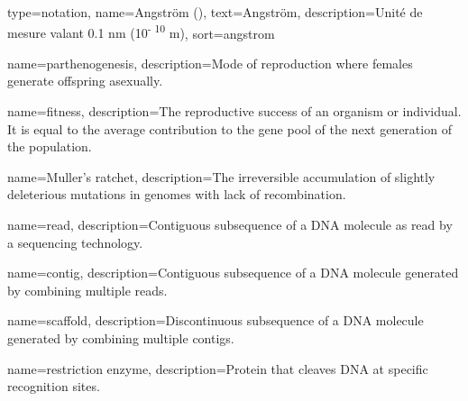 



{
	type=notation,
	name={Angstr\" om (\angstrom)},
    text=Angstr\" om,
	description={Unité de mesure valant 0.1 nm (10\textsuperscript{- 10} m)},
	sort={angstrom}
}

{
		name={parthenogenesis},
		description={Mode of reproduction where females generate offspring asexually.}
}

{
		name={fitness},
		description={The reproductive success of an organism or individual.  It is equal to the average contribution to the gene pool of the next generation of the population.}
}

{
		name={Muller's ratchet},
		description={The irreversible accumulation of slightly deleterious mutations in genomes with lack of recombination.}
}

{
	name={read},
	description={Contiguous subsequence of a DNA molecule as read by a sequencing technology.}}

{
	name={contig},
	description={Contiguous subsequence of a DNA molecule generated by combining multiple reads.}
}

{
	name={scaffold},
	description={Discontinuous subsequence of a DNA molecule generated by combining multiple contigs.}
}

{
	name={restriction enzyme},
	description={Protein that cleaves DNA at specific recognition sites.}
}




